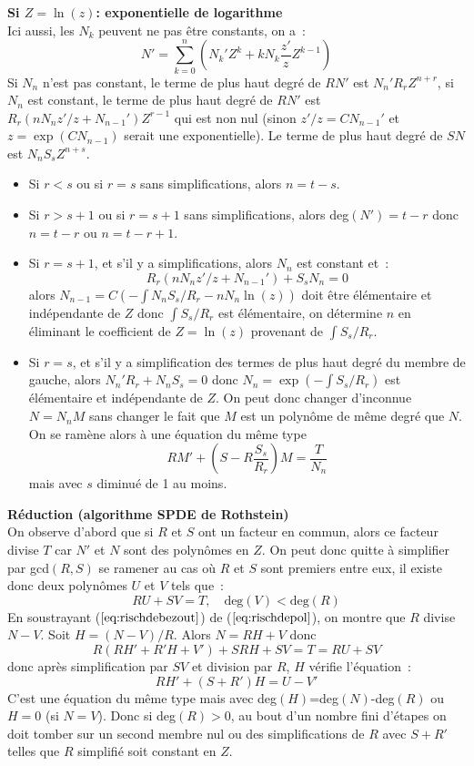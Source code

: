 \documentclass[a4paper,11pt]{article}
\begin{document}
\begin{giacjshere}
{\bf Si $Z=\ln(z)$: exponentielle de logarithme}\\
Ici aussi, les $N_k$ peuvent ne pas être constants, on a~:
\[ N'=\sum_{k=0}^n (N_k'Z^k+kN_k \frac{z'}{z} Z^{k-1})\]
Si $N_n$ n'est pas constant, le terme de plus haut degré de 
$RN'$ est $N_n' R_r Z^{n+r}$, si $N_n$ est constant, 
le terme de plus haut degré de $RN'$ est $R_r(nN_nz'/z+N_{n-1}') Z^{r-1}$ 
qui est non nul (sinon $z'/z=CN_{n-1}'$ et $z=\exp(CN_{n-1})$ serait 
une exponentielle).
Le terme de plus haut degré de $SN$ est $N_n S_s Z^{n+s}$.
\begin{itemize}
\item Si $r<s$ ou si $r=s$ sans simplifications,
alors $n=t-s$.
\item Si $r>s+1$ ou si $r=s+1$ sans simplifications,
alors deg$(N')=t-r$ donc $n=t-r$ ou $n=t-r+1$.
\item Si $r=s+1$, et s'il y a simplifications, alors $N_n$ est constant et~:
\[ R_r(nN_nz'/z+N_{n-1}')+ S_s N_n = 0 \]
alors $N_{n-1}=C (-\int N_n S_s/R_r -n N_n \ln(z))$
doit être élémentaire et indépendante de $Z$ donc $\int S_s/R_r$
est élémentaire, on détermine $n$ en éliminant le coefficient de 
$Z=\ln(z)$ provenant de $\int S_s/R_r$.
\item Si $r=s$, et s'il y a simplification des termes 
de plus haut degré du membre de gauche, 
alors $N_n' R_r+N_n S_s=0$ donc $N_n=\exp(-\int S_s/R_r)$
est élémentaire et indépendante de $Z$. On peut donc changer
d'inconnue $N=N_n M$ sans changer le fait que $M$ est un polynôme de
même degré que $N$. On se ramène alors à une équation du même type
\[ RM'+(S-R \frac{S_s}{R_r})M= \frac{T}{N_n}\]
mais avec $s$ diminué de 1 au moins.
\end{itemize}

{\bf R\'eduction (algorithme SPDE de Rothstein)}\\
On observe d'abord que si $R$ et $S$ ont un facteur
en commun, alors ce facteur divise $T$ car $N'$ et $N$ sont des polyn\^omes
en $Z$. On peut donc quitte \`a simplifier par gcd$(R,S)$ se ramener
au cas o\`u $R$ et $S$ sont premiers entre eux, il existe donc deux
polyn\^omes $U$ et $V$ tels que~:
\begin{equation} \label{eq:rischdebezout}
RU+SV=T, \quad \mbox{deg}(V)< \mbox{deg}(R)
\end{equation}
En soustrayant (\(\ref{eq:rischdebezout}\)) de (\(\ref{eq:rischdepol}\)), 
on montre que $R$ divise $N-V$. Soit $H=(N-V)/R$. Alors $N=RH+V$ donc
\[ R (RH'+R'H+V')+SRH+SV= T=RU+SV\]
donc apr\`es simplification par $SV$ et division par $R$, 
$H$ v\'erifie l'\'equation~:
\[ R H' + (S+R') H = U - V'\]
C'est une \'equation du m\^eme type mais avec deg$(H)$=deg$(N)$-deg$(R)$
ou $H=0$ (si $N=V$).
Donc si deg$(R)>0$, au bout d'un nombre fini d'\'etapes on doit 
tomber sur un second membre nul ou des simplifications de $R$ avec $S+R'$
telles que $R$ simplifié soit constant en $Z$.


\end{giacjshere}
\end{document}
